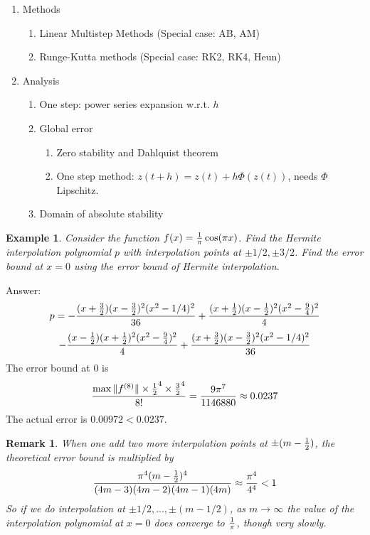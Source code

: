 \documentclass[20pt]{article} %
\theoremstyle{break}
\newtheorem{exa}[definition]{Example}
\newtheorem{rem}[definition]{Remark}
\begin{document}
{\begin{enumerate}
   \begin{enumerate}
   \item Methods
     \begin{enumerate}
     \item Linear Multistep Methods (Special case: AB, AM)
     \item Runge-Kutta methods (Special case: RK2, RK4, Heun)
      \end{enumerate}
    \item Analysis
      \begin{enumerate}
        \item One step: power series expansion w.r.t. $h$
        \item Global error
          \begin{enumerate}
          \item Zero stability and Dahlquist theorem
          \item One step method: $z(t+h)=z(t)+h\Phi(z(t))$, needs $\Phi$ Lipschitz.
          \end{enumerate}
        \item Domain of absolute stability
       \end{enumerate}
   \end{enumerate}

\end{enumerate}
}

\newpage

\begin{exa}Consider the function $f(x)={1\over \pi}\cos(\pi x)$. Find the Hermite interpolation polynomial $p$ with interpolation points at $\pm1/2, \pm 3/2$. Find the error bound at $x=0$ using the error bound of Hermite interpolation.\end{exa}

Answer:
\[p=-{(x+{3\over 2})(x-{3\over 2})^2(x^2-1/4)^2\over 36}+{(x+{1\over 2})(x-{1\over 2})^2(x^2-{9\over 4})^2\over 4}\]
\[-{(x-{1\over 2})(x+{1\over 2})^2(x^2-{9\over 4})^2\over 4}+{(x+{3\over 2})(x-{3\over 2})^2(x^2-1/4)^2\over 36}\]
The error bound at $0$ is
\[{\max\|f^{(8)}\|\times {1\over 2}^4\times {3\over 2}^4\over 8!}={9\pi^7\over 1146880}\approx 0.0237\]
The actual error is $0.00972<0.0237$.\\

\begin{rem}When one add two more interpolation points at $\pm (m-{1\over 2})$, the theoretical error bound is multiplied by
  \[{\pi^4(m-{1\over 2})^4\over (4m-3)(4m-2)(4m-1)(4m)}\approx {\pi^4\over 4^4}<1\]
  So if we do interpolation at $\pm 1/2, \dots, \pm (m-1/2)$, as $m\rightarrow \infty$ the value of the interpolation polynomial at $x=0$ does converge to $1\over \pi$, though very slowly.
\end{rem}
\end{document}
